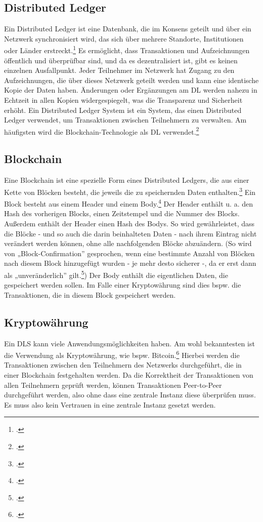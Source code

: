 \documentclass[12pt, a4paper]{article}
\begin{document}
{\subsection{Distributed Ledger}
\label{sec:definition-distributed-ledger}
Ein Distributed Ledger ist eine Datenbank, die im Konsens geteilt und über ein Netzwerk synchronisiert wird, das sich über mehrere Standorte, Institutionen oder Länder erstreckt.\footcite[Vgl. hierzu und zum Folgenden][]{w1,w2} 
Es ermöglicht, dass Transaktionen und Aufzeichnungen öffentlich und überprüfbar sind, und da es dezentralisiert ist, gibt es keinen einzelnen Ausfallpunkt. 
Jeder Teilnehmer im Netzwerk hat Zugang zu den Aufzeichnungen, die über dieses Netzwerk geteilt werden und kann eine identische Kopie der Daten haben. Änderungen oder Ergänzungen am DL werden nahezu in Echtzeit in allen Kopien widergespiegelt, was die Transparenz und Sicherheit erhöht.
\bigbreak
\noindent
Ein Distributed Ledger System ist ein System, das einen Distributed Ledger verwendet, um Transaktionen zwischen Teilnehmern zu verwalten. Am häufigsten wird die Blockchain-Technologie als DL verwendet.\footcite[Vgl.][]{w3}
\subsection{Blockchain}
\label{sec:definition-blockchain}
Eine Blockchain ist eine spezielle Form eines Distributed Ledgers, die aus einer Kette von Blöcken besteht, die jeweils die zu speichernden Daten enthalten.\footcite[Vgl.][16]{q3} 
Ein Block besteht aus einem Header und einem Body.\footcites[Vgl. hierzu und zum Folgenden][S. 161 ff\adddot]{q5}[]{w9}
\bigbreak
\noindent
Der Header enthält u. a. den Hash des vorherigen Blocks, einen Zeitstempel und die Nummer des Blocks.
Außerdem enthält der Header einen Hash des Bodys.
So wird gewährleistet, dass die Blöcke - und so auch die darin beinhalteten Daten - nach ihrem Eintrag nicht verändert werden können, ohne alle nachfolgenden Blöcke abzuändern. 
(So wird von „Block-Confirmation” gesprochen, wenn eine bestimmte Anzahl von Blöcken nach diesem Block hinzugefügt wurden - je mehr desto sicherer -, da er erst dann als „unveränderlich” gilt.\footcites[Vgl.][191]{q5})
\bigbreak
\noindent
Der Body enthält die eigentlichen Daten, die gespeichert werden sollen. Im Falle einer Kryptowährung sind dies bspw. die Transaktionen, die in diesem Block gespeichert werden.
\subsection{Kryptowährung}
\label{sec:definition-kryptowaehrung}
Ein DLS kann viele Anwendungsmöglichkeiten haben. Am wohl bekanntesten ist die Verwendung als Kryptowährung, wie bspw. Bitcoin.\footcite[Vgl. hierzu und zum Folgenden][1]{q4} 
Hierbei werden die Transaktionen zwischen den Teilnehmern des Netzwerks durchgeführt, die in einer Blockchain festgehalten werden. 
Da die Korrektheit der Transaktionen von allen Teilnehmern geprüft werden, können Transaktionen Peer-to-Peer durchgeführt werden, also ohne dass eine zentrale Instanz diese überprüfen muss.
Es muss also kein Vertrauen in eine zentrale Instanz gesetzt werden.
}
\end{document}
